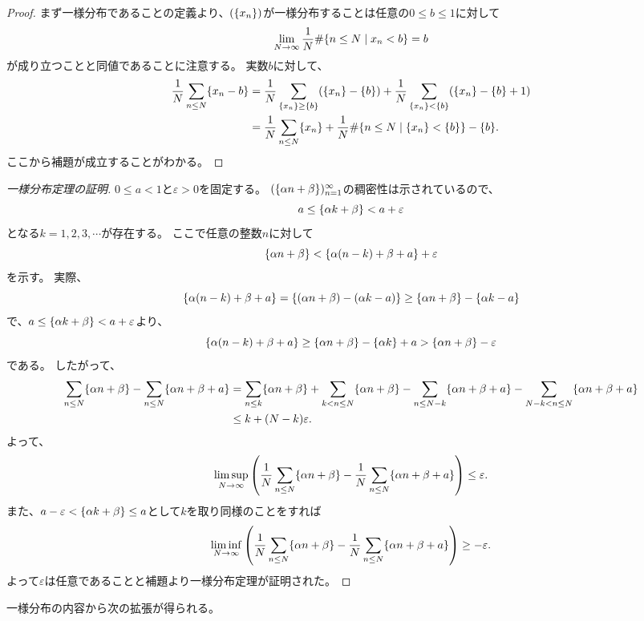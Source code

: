 \begin{proof}
まず一様分布であることの定義より、$(\{x_n\})$が一様分布することは任意の$0 \le b \le 1$に対して
$$
\lim_{N \to \infty}\frac{1}{N}\#\{ n \le N \mid x_n < b \} = b
$$
が成り立つことと同値であることに注意する。
実数$b$に対して、
$$
\begin{aligned}
\frac{1}{N}\sum_{n \le N}\{x_n-b\}
&= \frac{1}{N}\sum_{\{x_n\} \ge \{b\}}(\{x_n\}-\{b\})+\frac{1}{N}\sum_{\{x_n\} < \{b\}}(\{x_n\}-\{b\}+1) \\
&= \frac{1}{N}\sum_{n \le N}\{x_n\}+\frac{1}{N}\#\{ n \le N \mid \{x_n\} < \{b\} \}-\{b\}.
\end{aligned}
$$
ここから補題が成立することがわかる。
\end{proof}

\begin{proof}[一様分布定理の証明]
$0 \le a < 1$と$\varepsilon > 0$を固定する。
$(\{\alpha n+\beta\})_{n = 1}^\infty$の稠密性は示されているので、
$$
a \le \{\alpha k+\beta\} < a+\varepsilon
$$
となる$k = 1, 2, 3, \cdots$が存在する。
ここで任意の整数$n$に対して
$$
\{\alpha n+\beta\} < \{\alpha(n-k)+\beta+a\}+\varepsilon
$$
を示す。
実際、
$$
\{\alpha(n-k)+\beta+a\} = \{(\alpha n+\beta)-(\alpha k-a)\} \ge \{\alpha n+\beta\}-\{\alpha k-a\}
$$
で、$a \le \{\alpha k+\beta\} < a+\varepsilon$より、
$$
\{\alpha(n-k)+\beta+a\} \ge \{\alpha n+\beta\}-\{\alpha k\}+a > \{\alpha n+\beta\}-\varepsilon
$$
である。
したがって、
$$
\begin{aligned}
\sum_{n \le N}\{\alpha n+\beta\}-\sum_{n \le N}\{\alpha n+\beta+a\}
&= \sum_{n \le k}\{\alpha n+\beta\}+\sum_{k < n \le N}\{\alpha n+\beta\}-\sum_{n \le N-k}\{\alpha n+\beta+a\}-\sum_{N-k < n \le N}\{\alpha n+\beta+a\} \\
&\le k+(N-k)\varepsilon.
\end{aligned}
$$
よって、
$$
\limsup_{N \to \infty}\qty(\frac{1}{N}\sum_{n \le N}\{\alpha n+\beta\}-\frac{1}{N}\sum_{n \le N}\{\alpha n+\beta+a\}) \le \varepsilon.
$$
また、$a-\varepsilon < \{\alpha k+\beta\} \le a$として$k$を取り同様のことをすれば
$$
\liminf_{N \to \infty}\qty(\frac{1}{N}\sum_{n \le N}\{\alpha n+\beta\}-\frac{1}{N}\sum_{n \le N}\{\alpha n+\beta+a\}) \ge -\varepsilon.
$$
よって$\varepsilon$は任意であることと補題より一様分布定理が証明された。
\end{proof}

一様分布の内容から次の拡張が得られる。

